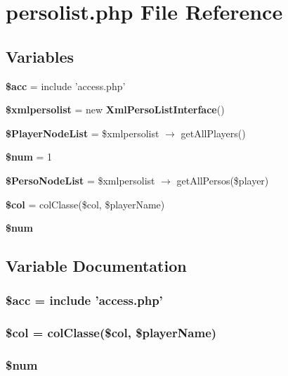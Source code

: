 \section{persolist.php File Reference}
\label{persolist_8php}


\subsection*{Variables}
\begin{CompactItemize}
\item 
{\bf \$acc} = include 'access.php'
\item 
{\bf \$xmlpersolist} = new {\bf Xml\-Perso\-List\-Interface}()
\item 
{\bf \$Player\-Node\-List} = \$xmlpersolist $\rightarrow$ get\-All\-Players()
\item 
{\bf \$num} = 1
\item 
{\bf \$Perso\-Node\-List} = \$xmlpersolist $\rightarrow$ get\-All\-Persos(\$player)
\item 
{\bf \$col} = col\-Classe(\$col, \$player\-Name)
\item 
{\bf \$num}
\end{CompactItemize}


\subsection{Variable Documentation}
\subsubsection{\setlength{\rightskip}{0pt plus 5cm}\$acc = include 'access.php'}\label{persolist_8php_542926c588a05eb69553d79c83cf73da}


\subsubsection{\setlength{\rightskip}{0pt plus 5cm}\$col = col\-Classe(\$col, \$player\-Name)}\label{persolist_8php_fca5b7d4c9144178253e99d0ada7d519}


\subsubsection{\setlength{\rightskip}{0pt plus 5cm}\$num}\label{persolist_8php_606c9dff2aade84f01338c3c4cd8016b}


